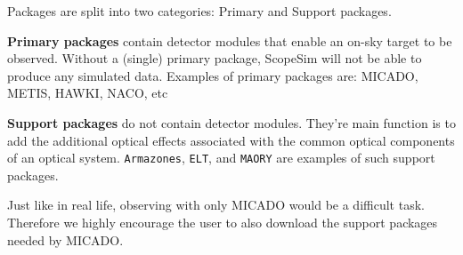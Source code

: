 Packages are split into two categories: Primary and Support packages.

\textbf{Primary packages} contain detector modules that enable an on-sky target to be observed.
Without a (single) primary package, ScopeSim will not be able to produce any simulated data.
Examples of primary packages are: MICADO, METIS, HAWKI, NACO, etc

\textbf{Support packages} do not contain detector modules.
They're main function is to add the additional optical effects associated with the common optical components of an optical system.
\texttt{Armazones}, \texttt{ELT}, and \texttt{MAORY} are examples of such support packages.

Just like in real life, observing with only MICADO would be a difficult task.
Therefore we highly encourage the user to also download the support packages needed by MICADO.
